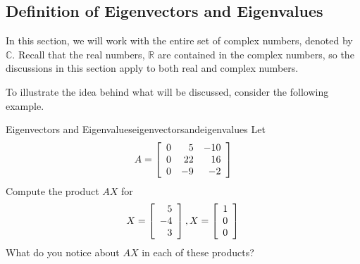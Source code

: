\subsection{Definition of Eigenvectors and Eigenvalues}

In this section, we will work with the entire set of complex numbers, 
denoted by $\mathbb{C}$. Recall that the real numbers, $\mathbb{R}$ are 
contained in the complex numbers, so the discussions in this section 
apply to both real and complex numbers. 

To illustrate the idea behind what will be discussed, consider the following
example.

\begin{example}{Eigenvectors and Eigenvalues}{eigenvectorsandeigenvalues}
Let
\begin{equation*}
A = \left[
\begin{array}{rrr}
0 & 5 & -10 \\
0 & 22 & 16 \\
0 & -9 & -2
\end{array}
\right] 
\end{equation*}
Compute the product $AX$ for 
\begin{equation*}
X = \left[
\begin{array}{r}
5 \\
-4 \\
 3
\end{array}
\right], X = \left[
\begin{array}{r}
1 \\
0 \\
0
\end{array}
\right]
\end{equation*}
What do you notice about $AX$ in each of these products? 
\end{example}

